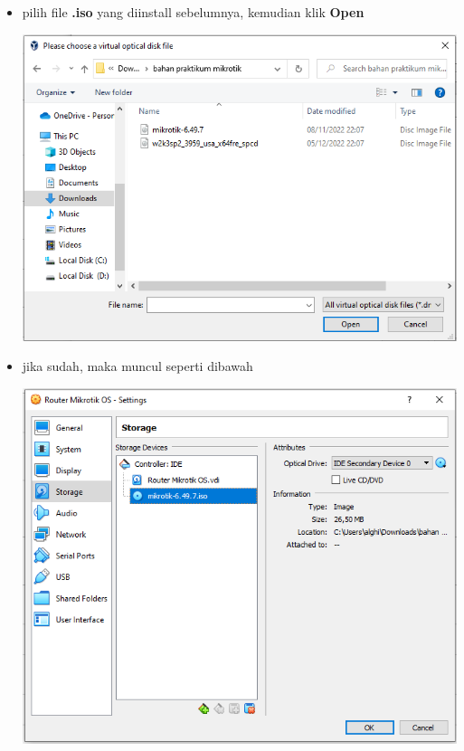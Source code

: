 \documentclass{article}
\begin{document}
\begin{flushleft}
\begin{itemize}
			\item pilih file \textbf{.iso} yang diinstall sebelumnya, kemudian klik \textbf{Open}
				\begin{center}
					\includegraphics[scale=0.6]{(d)} 
				\end{center}
				
			\item jika sudah, maka muncul seperti dibawah 
				\begin{center}
					\includegraphics[scale=0.6]{(c.1)}
				\end{center}
			

\end{itemize}
\end{flushleft}
\end{document}
